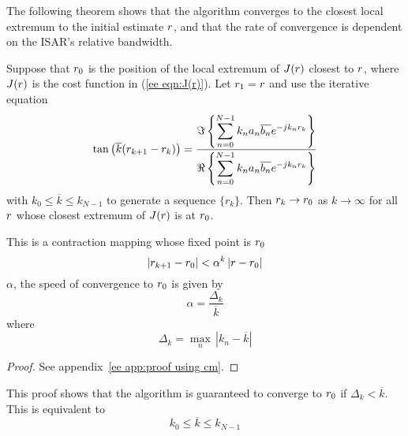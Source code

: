 The following theorem shows that the algorithm converges to the closest
local extremum to the initial estimate ${r}$, and that the rate of
convergence is dependent on the ISAR's relative bandwidth.  

\begin{theorem}
\label{ee thm:min with cm}\mbox{}\par

Suppose that ${r}_0$ is the position of the local extremum of $J({r})$ closest
to ${r}$, where $J({r})$ is the cost function in (\ref{ee eqn:J(r)}).  
Let ${r}_1={r}$ and use the iterative equation
\begin{equation}\label{ee eqn:cm}
\tan\left(\overline{k}({r}_{k+1}-{r}_k)\right)=
\frac{
  \Im\left\{\displaystyle\sum_{n=0}^{N-1}k_na_n\overline{b_n}{e^{-jk_n{r}_k}}\right\}
}{
  \Re\left\{\displaystyle\sum_{n=0}^{N-1}k_na_n\overline{b_n}{e^{-jk_n{r}_k}}\right\}
}
\end{equation}
with $k_0\leq\overline{k}\leq k_{N-1}$ to generate a sequence $\{r_k\}$.  
Then ${r}_k\rightarrow{r}_0$ as $k\rightarrow\infty$ for all ${r}$ whose
closest extremum of $J({r})$ is at ${r}_0$.

This is a contraction mapping whose fixed point is ${r}_0$
\begin{equation}
\left|{r}_{k+1}-{r}_0\right|< \alpha^k \left|{r}-{r}_0\right|
\end{equation}
$\alpha$, the speed of convergence to ${r}_0$ is given by
\begin{equation}
\alpha=\frac{\Delta_k}{\overline{k}}
\end{equation}
where
\begin{equation}
\Delta_k=\max_n\,\left|k_n-\overline{k}\right|
\end{equation}
\end{theorem}

\begin{proof}
See appendix~\ref{ee app:proof using cm}.
\end{proof}


This proof shows that the algorithm is guaranteed to converge to ${r}_0$ 
if $\Delta_k<\overline{k}$.  This is equivalent to
\begin{equation}
k_0\leq\overline{k}\leq k_{N-1}
\end{equation}

